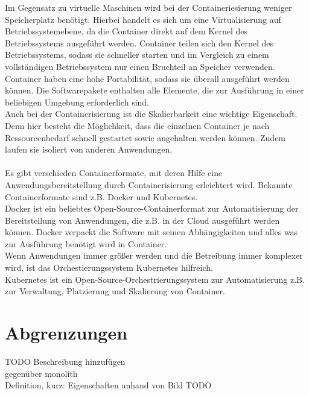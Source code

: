Im Gegensatz zu virtuelle Maschinen wird bei der Containeriesierung weniger Speicherplatz benötigt. Hierbei handelt es sich um eine Virtualisierung auf Betriebssystemebene, da die Container direkt auf dem Kernel des Betriebssystems ausgeführt werden. Container teilen sich den Kernel des Betriebssystems, sodass sie schneller starten und im Vergleich zu einem vollständigen Betriebssystem nur einen Bruchteil an Speicher verwenden.\\
Container haben eine hohe Portabilität, sodass sie überall ausgeführt werden können. Die Softwarepakete enthalten alle Elemente, die zur Ausführung in einer beliebigen Umgebung erforderlich sind.\\
Auch bei der Containerisierung ist die Skalierbarkeit eine wichtige Eigenschaft. Denn hier besteht die Möglichkeit, dass die einzelnen Container je nach Ressourcenbedarf schnell gestartet sowie angehalten werden können. Zudem laufen sie isoliert von anderen Anwendungen.\\
\\
Es gibt verschieden Containerformate, mit deren Hilfe eine Anwendungsbereitstellung durch Containerisierung erleichtert wird. Bekannte Containerformate sind z.B. Docker und Kubernetes.\\
Docker ist ein beliebtes Open-Source-Containerformat zur Automatisierung der Bereitstellung von Anwendungen, die z.B. in der Cloud ausgeführt werden können. Docker verpackt die Software mit seinen Abhängigkeiten und alles was zur Ausführung benötigt wird in Container.\\
Wenn Anwendungen immer größer werden und die Betreibung immer komplexer wird, ist das Orchestierungssystem Kubernetes hilfreich.\\
Kubernetes ist ein Open-Source-Orchestrierungssystem zur Automatisierung z.B. zur Verwaltung, Platzierung und Skalierung von Container.

\section{Abgrenzungen}
TODO Beschreibung hinzufügen\\
gegenüber monolith\\
Definition, kurz: Eigenschaften anhand von Bild TODO\\

